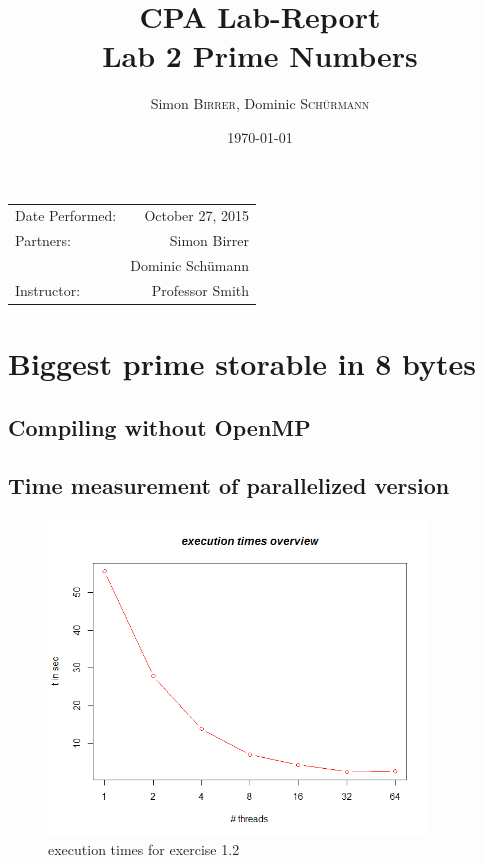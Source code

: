 \documentclass{article}
\title{CPA Lab-Report \\ Lab 2 Prime Numbers} %
\author{Simon \textsc{Birrer}, Dominic \textsc{Sch\"urmann}} %
\date{\today} %
\begin{document}
\maketitle %

\begin{center}
\begin{tabular}{l r}
Date Performed: & October 27, 2015 \\ %
Partners: & Simon Birrer \\ %
& Dominic Sch\"umann \\
Instructor: & Professor Smith %
\end{tabular}
\end{center}

\bigskip

\tableofcontents

\pagebreak

\section{Biggest prime storable in 8 bytes}

\subsection{Compiling without OpenMP}
\subsection{Time measurement of parallelized version}

\begin{figure}[ht]
	\centering
  \includegraphics[width=0.9\textwidth]{statistics/Ex12ResultGraph.png}
	\caption{execution times for exercise 1.2}
\end{figure}
\end{document}
